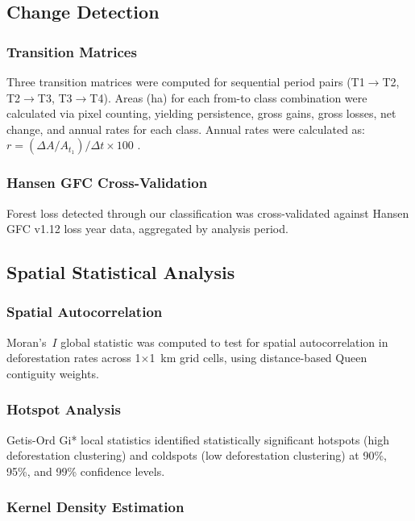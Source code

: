 \documentclass[12pt,a4paper]{article}
\begin{document}
\subsection{Change Detection}

\subsubsection{Transition Matrices}

Three transition matrices were computed for sequential period pairs (T1$\rightarrow$T2, T2$\rightarrow$T3, T3$\rightarrow$T4). Areas (ha) for each from-to class combination were calculated via pixel counting, yielding persistence, gross gains, gross losses, net change, and annual rates for each class. Annual rates were calculated as: $r = (\Delta A / A_{t_1}) / \Delta t \times 100$ \citep{Puyravaud2003}.

\subsubsection{Hansen GFC Cross-Validation}

Forest loss detected through our classification was cross-validated against Hansen GFC v1.12 loss year data, aggregated by analysis period.

\subsection{Spatial Statistical Analysis}

\subsubsection{Spatial Autocorrelation}

Moran's~$I$ global statistic \citep{Moran1950,Anselin1995} was computed to test for spatial autocorrelation in deforestation rates across 1$\times$1~km grid cells, using distance-based Queen contiguity weights.

\subsubsection{Hotspot Analysis}

Getis-Ord Gi* local statistics \citep{Getis1992} identified statistically significant hotspots (high deforestation clustering) and coldspots (low deforestation clustering) at 90\%, 95\%, and 99\% confidence levels.

\subsubsection{Kernel Density Estimation}
\end{document}
